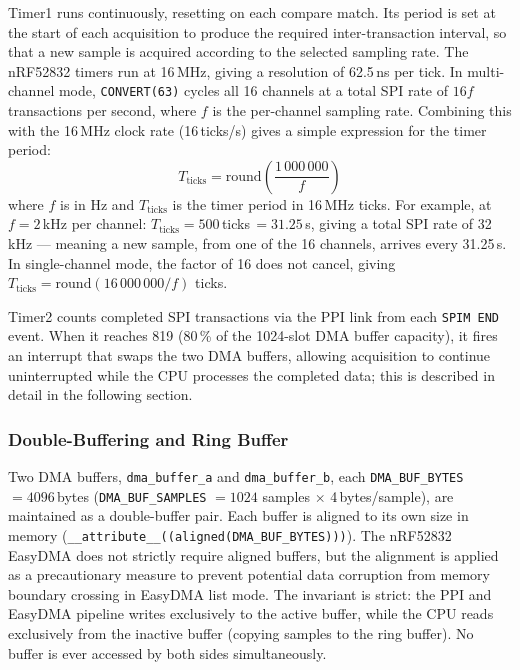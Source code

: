 Timer1 runs continuously, resetting on each compare match. Its period is set at the
start of each acquisition to produce the required inter-transaction interval, so that
a new sample is acquired according to the selected sampling rate. The
nRF52832 timers run at 16\,MHz, giving a resolution of 62.5\,ns per tick.
In multi-channel mode, \texttt{CONVERT(63)} cycles all 16 channels at a total SPI
rate of $16f$ transactions per second, where $f$ is the per-channel sampling rate.
Combining this with the 16\,MHz clock rate (16\,ticks/\textmu s) gives a simple
expression for the timer period:
\begin{equation}
    T_\text{ticks} = \mathrm{round}\!\left(\frac{1\,000\,000}{f}\right)
    \label{eq:timer_period}
\end{equation}
where $f$ is in Hz and $T_\text{ticks}$ is the timer period in 16\,MHz ticks.
For example, at $f = 2$\,kHz per channel: $T_\text{ticks} = 500$\,ticks\,$= 31.25$\,\textmu s,
giving a total SPI rate of 32\,kHz --- meaning a new sample, from one of the 16
channels, arrives every 31.25\,\textmu s. In single-channel mode, the factor of 16 does
not cancel, giving $T_\text{ticks} = \mathrm{round}(16\,000\,000/f)$ ticks.

Timer2 counts completed SPI transactions via the PPI link from each
\texttt{SPIM END} event. When it reaches 819 (80\,\% of the 1024-slot DMA buffer
capacity), it fires an interrupt that swaps the two DMA buffers, allowing
acquisition to continue uninterrupted while the CPU processes the completed data;
this is described in detail in the following section.

\subsubsection{Double-Buffering and Ring Buffer}

Two DMA buffers, \texttt{dma\_buffer\_a} and \texttt{dma\_buffer\_b}, each
\texttt{DMA\_BUF\_BYTES} $= 4096$\,bytes (\texttt{DMA\_BUF\_SAMPLES} $= 1024$
samples $\times$ 4\,bytes/sample), are maintained as a double-buffer pair. Each
buffer is aligned to its own size in memory (\texttt{\_\_attribute\_\_((aligned(DMA\_BUF\_BYTES)))}).
The nRF52832 EasyDMA does not strictly require aligned buffers, but the alignment
is applied as a precautionary measure to prevent potential data corruption from
memory boundary crossing in EasyDMA list mode. The invariant is
strict: the PPI and EasyDMA pipeline writes exclusively to the active buffer, while
the CPU reads exclusively from the inactive buffer (copying samples to the ring
buffer). No buffer is ever accessed by both sides simultaneously.

